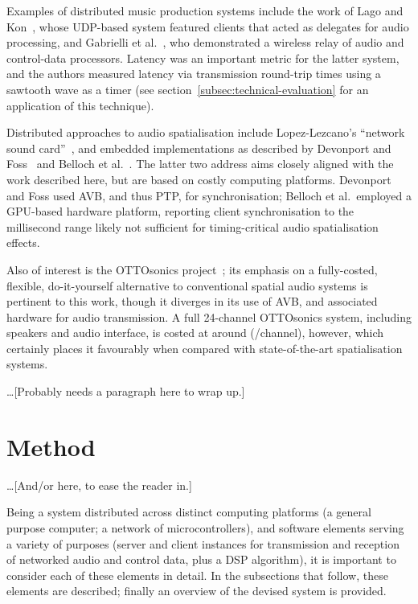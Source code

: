 \documentclass[utf8]{FrontiersinHarvard}
\newcommand{\secref}[1]{section~\ref{#1}}
\begin{document}
    Examples of distributed music production systems include the work of
    Lago and Kon~\citep{lago_middleware_2003}, whose UDP-based system featured
    clients that acted as delegates for audio processing, and Gabrielli et
    al.~\citep{gabrielli_networked_2012}, who demonstrated a wireless relay of
    audio and control-data processors.
    Latency was an important metric for the latter system, and the authors
    measured latency via transmission round-trip times using a sawtooth wave as
    a timer (see \secref{subsec:technical-evaluation} for an application of this
    technique).

    Distributed approaches to audio spatialisation include Lopez-Lezcano's
    ``network sound card''~\citep{lopez-lezcano_jack_2012}, and embedded
    implementations as described by Devonport and
    Foss~\citep{devonport_distribution_2019} and Belloch et
    al.~\citep{belloch_performance_2021}.
    The latter two address aims closely aligned with the work described here,
    but are based on costly computing platforms.
    Devonport and Foss used AVB, and thus PTP, for synchronisation; Belloch et
    al.\ employed a GPU-based hardware platform, reporting client
    synchronisation to the millisecond range \textemdash{} likely not sufficient
    for timing-critical audio spatialisation effects.

    Also of interest is the OTTOsonics
    project~\citep{mitterhuber_ottosonics_2022};
    its emphasis on a fully-costed, flexible, do-it-yourself alternative to
    conventional spatial audio systems is pertinent to this work, though it
    diverges in its use of AVB, and associated hardware for audio transmission.
    A full 24-channel OTTOsonics system, including speakers and audio interface,
    is costed at around  (/channel), however,
    which certainly places it favourably when compared with state-of-the-art
    spatialisation systems.

    \dots [Probably needs a paragraph here to wrap up.]

    \section{Method}\label{sec:method}

    \dots [And/or here, to ease the reader in.]

    Being a system distributed across distinct computing platforms (a general
    purpose computer; a network of microcontrollers), and software elements
    serving a variety of purposes (server and client instances for transmission
    and reception of networked audio and control data, plus a DSP algorithm), it is
    important to consider each of these elements in detail.
    In the subsections that follow, these elements are described;
    finally an overview of the devised system is provided.
\end{document}
